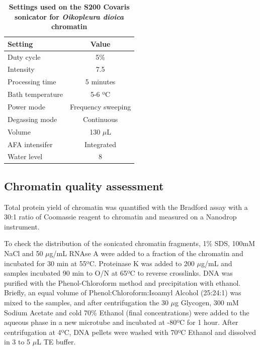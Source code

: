 \documentclass[11pt,twoside,a4paper]{report}
\begin{document}
			\begin{table}[!ht]
        		\caption{\bf{Settings used on the S200 Covaris sonicator for \textit{Oikopleura dioica} chromatin}}
        		\begin{center}
	        		\begin{tabular}{l|c}
		           		\textbf{Setting} & \textbf{Value}\\
	        		    \hline
		        		Duty cycle& 5\%\\
	            	    Intensity & 7.5\\
						Processing time & 5 minutes\\
		        		Bath temperature & 5-6 ºC\\
						Power mode & Frequency sweeping\\
		        		Degassing mode & Continuous\\
		        		Volume & 130 $\mu$L\\
		        		AFA intensifer & Integrated\\
	        			Water level & 8\\
	        		\end{tabular}
    		    \end{center}
	        \label{table:CovarisSettings}
		    \end{table}
			
			\subsection{Chromatin quality assessment}
			\label{section:chromQualityAssess}
			Total protein yield of chromatin was quantified with the Bradford assay with a 30:1 ratio of Coomassie reagent to chromatin and measured on a Nanodrop instrument.
			
			To check the distribution of the sonicated chromatin fragments, 1\% SDS, 100mM NaCl and 50 $\mu$g/mL RNAse A were added to a fraction of the chromatin and incubated for 30 min at 55ºC. Proteinase K was added to 200 $\mu$g/mL and samples incubated 90 min to O/N at 65ºC to reverse crosslinks. DNA was purified with the Phenol-Chloroform method and precipitation with ethanol. Briefly, an equal volume of Phenol:Chloroform:Isoamyl Alcohol (25:24:1) was mixed to the samples, and after centrifugation the 30 $\mu$g Glycogen, 300 mM Sodium Acetate and cold 70\% Ethanol (final concentrations) were added to the aqueous phase in a new microtube and incubated at -80ºC for 1 hour. After centrifugation at 4ºC, DNA pellets were washed with 70ºC Ethanol and dissolved in 3 to 5 $\mu$L TE buffer. \\
			
\end{document}
